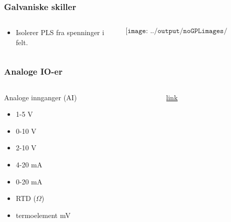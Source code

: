 \documentclass[aspectratio=169,xcolor=dvipsnames]{beamer}
\begin{document}
\begin{frame}
	\frametitle{Galvaniske skiller}
	\begin{columns}
		\begin{column}{0.5\textwidth}
			\begin{itemize}
				\item Isolerer PLS fra spenninger i felt. 
			\end{itemize}

			
		\end{column}

		\begin{column}{0.5\textwidth}
	$$\texttt{[image: ../output/noGPLimages/pls06.png]}$$
		\end{column}
	\end{columns}
\end{frame}


\begin{frame}
	\frametitle{Analoge IO-er}
	\begin{columns}
		\begin{column}{0.5\textwidth}
			Analoge innganger (AI)
			\begin{itemize}
				\item 1-5 V
				\item 0-10 V
				\item 2-10 V
				\item 4-20 mA
				\item 0-20 mA
				\item RTD ($\Omega$)
				\item termoelement mV
			\end{itemize}

			
		\end{column}

		\begin{column}{0.5\textwidth}
			\href{https://www.contec.com/support/basic-knowledge/daq-control/analog-io/}{link}
		\end{column}
	\end{columns}
\end{frame}
\end{document}
